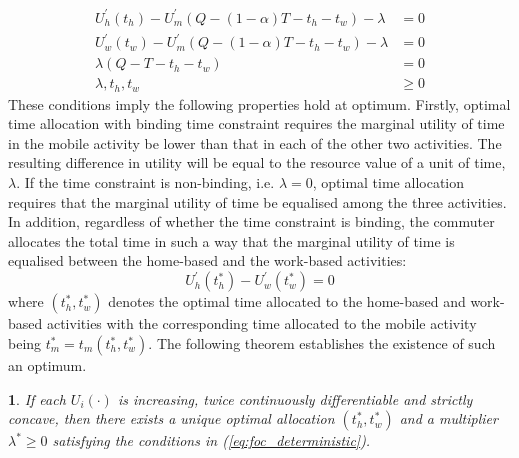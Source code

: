 \documentclass[12pt,a4paper,british]{article}
\theoremstyle{definition}
\theoremstyle{plain}
\newtheorem{thm}{\protect\theoremname}
\theoremstyle{plain}
\providecommand{\theoremname}{Theorem}
\begin{document}
\begin{equation}
\begin{aligned}U_{h}^{\prime}\left(t_{h}\right)-U_{m}^{\prime}\left(Q-\left(1-\alpha\right)T-t_{h}-t_{w}\right)-\lambda & =0\\
U_{w}^{\prime}\left(t_{w}\right)-U_{m}^{\prime}\left(Q-\left(1-\alpha\right)T-t_{h}-t_{w}\right)-\lambda & =0\\
\lambda\left(Q-T-t_{h}-t_{w}\right) & =0\\
\lambda,t_{h},t_{w} & \geq0
\end{aligned}
\label{eq:foc_deterministic}
\end{equation}
These conditions imply the following properties hold at optimum. Firstly, optimal time allocation with binding time constraint requires the marginal utility of time in the mobile activity be lower than that in each of the other two activities. The resulting difference in utility will be equal to the resource value of a unit of time, $\lambda$. If the time constraint is non-binding, i.e. $\lambda=0$, optimal time allocation requires that the marginal utility of time be equalised among the three activities. In addition, regardless of whether the time constraint is binding, the commuter allocates the total time in such a way that the marginal utility of time is equalised between the home-based and the work-based activities:%
\begin{equation}
U_{h}^{\prime}\left(t_{h}^{\ast}\right)-U_{w}^{\prime}\left(t_{w}^{\ast}\right)=0\label{eq:Uh_eq_Uw}
\end{equation}%
where $\left(t_{h}^{\ast},t_{w}^{\ast}\right)$ denotes the optimal time allocated to the home-based and work-based activities with the corresponding time allocated to the mobile activity being $t_{m}^{\ast}=t_{m}\left(t_{h}^{\ast},t_{w}^{\ast}\right)$. The following theorem establishes the existence of such an optimum.
\begin{thm}
If each $U_{i}\left(\cdot\right)$ is increasing, twice continuously differentiable and strictly concave, then there exists a unique optimal allocation $\left(t_{h}^{\ast},t_{w}^{\ast}\right)$ and a multiplier \textup{$\lambda^{\ast}\geq0$} satisfying the conditions in (\ref{eq:foc_deterministic}).
\end{thm}
\end{document}
